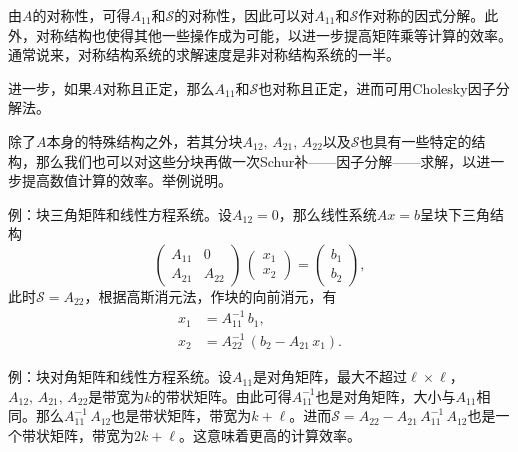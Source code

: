 \begin{subappendices}
由$A$的对称性，可得$A_{11}$和$\mathcal{S}$的对称性，因此可以对$A_{11}$和$\mathcal{S}$作对称的因式分解。此外，对称结构也使得其他一些操作成为可能，以进一步提高矩阵乘等计算的效率。通常说来，对称结构系统的求解速度是非对称结构系统的一半。

进一步，如果$A$对称且正定，那么$A_{11}$和$\mathcal{S}$也对称且正定，进而可用Cholesky因子分解法。

除了$A$本身的特殊结构之外，若其分块$A_{12}, \,A_{21}, \,A_{22}$以及$\mathcal{S}$也具有一些特定的结构，那么我们也可以对这些分块再做一次Schur补——因子分解——求解，以进一步提高数值计算的效率。举例说明。

例：块三角矩阵和线性方程系统。设$A_{12}=0$，那么线性系统$A x = b$呈块下三角结构
\begin{equation*}
  \begin{pmatrix}
    A_{11} & 0 \\
    A_{21} & A_{22}
  \end{pmatrix}
  \,
  \begin{pmatrix}
    x_{1} \\
    x_{2}
  \end{pmatrix}
  =
  \begin{pmatrix}
  b_{1} \\ b_{2}
  \end{pmatrix},
\end{equation*}
此时$\mathcal{S} = A_{22}$，根据高斯消元法，作块的向前消元，有
\begin{equation*}
  \begin{split}
    x_{1} & = A_{11}^{-1} \, b_{1}, \\
    x_{2} & = A_{22}^{-1} \, \left( b_{2} - A_{21} \, x_{1} \right).
  \end{split}
\end{equation*}

例：块对角矩阵和线性方程系统。设$A_{11}$是对角矩阵，最大不超过$\ell \times \ell$，$A_{12}, \, A_{21}, \, A_{22}$是带宽为$k$的带状矩阵。由此可得$A_{11}^{-1}$也是对角矩阵，大小与$A_{11}$相同。那么$A_{11}^{-1} \, A_{12}$也是带状矩阵，带宽为$k + \ell$。进而$\mathcal{S} = A_{22} - A_{21} \, A_{11}^{-1} \, A_{12}$也是一个带状矩阵，带宽为$2 k + \ell$。这意味着更高的计算效率。



\end{subappendices}
